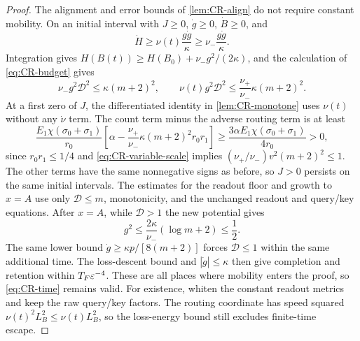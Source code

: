 \begin{proof}
The alignment and error bounds of \cref{lem:CR-align} do not require constant mobility.
On an initial interval with $J\ge0$, $\dot g\ge0$, $\dot B\ge0$, and
\[
 \dot H\ge\nu(t)\frac{g\dot g}{\kappa}\ge\nu_-\frac{g\dot g}{\kappa}.
\]
Integration gives $H(B(t))\ge H(B_0)+\nu_-g^2/(2\kappa)$, and the calculation of \cref{eq:CR-budget} gives
\begin{equation}
 \nu_-g^2\mathcal D^2\le\kappa(m+2)^2,\qquad
 \nu(t)g^2\mathcal D^2\le\frac{\nu_+}{\nu_-}\kappa(m+2)^2.
 \label{eq:CR-variable-budget}
\end{equation}
At a first zero of $J$, the differentiated identity in \cref{lem:CR-monotone} uses $\nu(t)$ without any $\dot\nu$ term.
The count term minus the adverse routing term is at least
\[
 \frac{E_1\chi(\sigma_0+\sigma_1)}{r_0}
 \left[\alpha-\frac{\nu_+}{\nu_-}\kappa(m+2)^2r_0r_1\right]
 \ge\frac{3\alpha E_1\chi(\sigma_0+\sigma_1)}{4r_0}>0,
\]
since $r_0r_1\le1/4$ and \cref{eq:CR-variable-scale} implies
$(\nu_+/\nu_-)v^2(m+2)^2\le1$.
The other terms have the same nonnegative signs as before, so $J>0$ persists on the same initial intervals.
The estimates for the readout floor and growth to $x=A$ use only $\mathcal D\le m$, monotonicity, and the unchanged readout and query/key equations.
After $x=A$, while $\mathcal D>1$ the new potential gives
\[
 g^2\le\frac{2\kappa}{\nu_-}(\log m+2)\le\frac12.
\]
The same lower bound $\dot g\ge\kappa p/[8(m+2)]$ forces $\mathcal D\le1$ within the same additional time.
The loss-descent bound and $|\dot g|\le\kappa$ then give completion and retention within $T_F\varepsilon^{-4}$.
These are all places where mobility enters the proof, so \cref{eq:CR-time} remains valid.
For existence, whiten the constant readout metrics and keep the raw query/key factors. The routing coordinate has speed squared
$\nu(t)^2L_B^2\le\nu(t)L_B^2$, so the loss-energy bound still excludes finite-time escape.
\end{proof}

